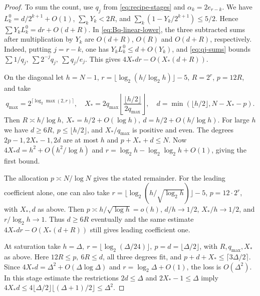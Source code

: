 \begin{proof}
To sum the count, use \(q_j\) from \eqref{eq:recipe-stages} and \(\alpha_k=2e_{r-k}\). We have \(L^0_k=d/2^{k+1}+O(1)\), \(\sum_k Y_k<2R\), and \(\sum_k(1-Y_k/2^{k+1})\le5/2\). Hence \(\sum Y_kL^0_k=dr+O(d+R)\). In \eqref{eq:Bq-linear-lower}, the three subtracted sums after multiplication by \(Y_k\) are \(O(d+R)\), \(O(R)\) and \(O(d+R)\), respectively. Indeed, putting \(j=r-k\), one has \(Y_kL^0_k\le d+O(Y_k)\), and \eqref{eq:qj-sums} bounds \(\sum 1/q_j,\ \sum 2^{-j}q_j,\ \sum q_j/e_j\). This gives \(4X_*dr-O(X_*(d+R))\).

On the diagonal let \(h=N-1\), \(r=\lfloor\log_2(h/\log_2 h)\rfloor-5\), \(R=2^r\), \(p=12R\), and take
\[
 q_{\max}=2^{\lceil\log_2\max(2,r)\rceil},\quad
 X_*=2q_{\max}\left\lfloor\frac{\lfloor h/2\rfloor}{2q_{\max}}\right\rfloor,\quad
 d=\min(\lfloor h/2\rfloor,N-X_*-p).
\]
Then \(R\asymp h/\log h,\ X_*=h/2+O(\log h),\ d=h/2+O(h/\log h)\). For large \(h\) we have \(d\ge6R,\ p\le\lfloor h/2\rfloor\), and \(X_*/q_{\max}\) is positive and even. The degrees \(2p-1,2X_*-1,2d\) are at most \(h\) and \(p+X_*+d\le N\). Now \(4X_*d=h^2+O(h^2/\log h)\) and \(r=\log_2 h-\log_2\log_2 h+O(1)\), giving the first bound.

The allocation \(p\asymp N/\log N\) gives the stated remainder. For the leading coefficient alone, one can also take \(r=\lfloor\log_2(h/\sqrt{\log_2 h})\rfloor-5\), \(p=12\cdot2^r\), with \(X_*,d\) as above. Then \(p\asymp h/\sqrt{\log h}=o(h)\), \(d/h\to1/2\), \(X_*/h\to1/2\), and \(r/\log_2h\to1\). Thus \(d\ge6R\) eventually and the same estimate \(4X_*dr-O(X_*(d+R))\) still gives leading coefficient one.

At saturation take \(h=\Delta,\ r=\lfloor\log_2(\Delta/24)\rfloor,\ p=d=\lfloor\Delta/2\rfloor\), with \(R,q_{\max},X_*\) as above. Here \(12R\le p,\ 6R\le d\), all three degrees fit, and \(p+d+X_*\le\lceil3\Delta/2\rceil\). Since \(4X_*d=\Delta^2+O(\Delta\log\Delta)\) and \(r=\log_2\Delta+O(1)\), the loss is \(O(\Delta^2)\). In this stage estimate the restrictions \(2d\le\Delta\) and \(2X_*-1\le\Delta\) imply \(4X_*d\le4\lfloor\Delta/2\rfloor\lfloor(\Delta+1)/2\rfloor\le\Delta^2\).
\end{proof}

